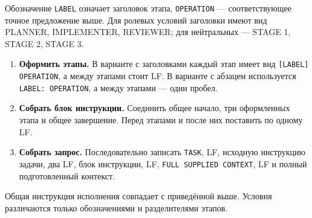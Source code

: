 Обозначение \texttt{LABEL} означает заголовок этапа, \texttt{OPERATION} --- соответствующее точное предложение выше. Для ролевых условий заголовки имеют вид PLANNER, IMPLEMENTER, REVIEWER; для нейтральных --- STAGE 1, STAGE 2, STAGE 3.
\begin{enumerate}
\item \textbf{Оформить этапы.} В варианте с заголовками каждый этап имеет вид \texttt{[LABEL] OPERATION}, а между этапами стоит LF. В варианте с абзацем используется \texttt{LABEL: OPERATION}, а между этапами --- один пробел.
\item \textbf{Собрать блок инструкции.} Соединить общее начало, три оформленных этапа и общее завершение. Перед этапами и после них поставить по одному LF.
\item \textbf{Собрать запрос.} Последовательно записать \texttt{TASK}, LF, исходную инструкцию задачи, два LF, блок инструкции, LF, \texttt{FULL SUPPLIED CONTEXT}, LF и полный подготовленный контекст.
\end{enumerate}
Общая инструкция исполнения совпадает с приведённой выше. Условия различаются только обозначениями и разделителями этапов.
